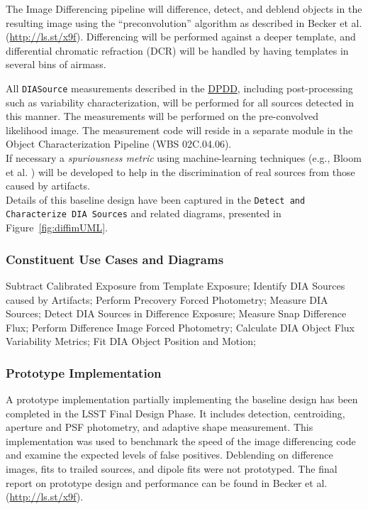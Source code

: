 \documentclass[12pt]{article}
\newcommand{\code}[1]{\texttt{#1}}
\newcommand{\DIASource}{\code{DIASource}\xspace}
\newcommand{\ds}[2]{{\color{blue} \href{https://docushare.lsstcorp.org/docushare/dsweb/Get/#1}{#2}}\xspace}
\newcommand{\DPDD}{\ds{LSE-163}{DPDD}}
\newcommand{\wbsObjChar}{WBS 02C.04.06}
\newcommand{\uc}[1]{{\tt #1}}
\begin{document}
The Image Differencing pipeline will difference, detect, and deblend objects in the resulting image using the ``preconvolution'' algorithm as described in Becker et al. (\url{http://ls.st/x9f}).
Differencing will be performed against a deeper template, and differential chromatic refraction (DCR) will be handled by having templates in several bins of airmass.

All \DIASource measurements described in the \DPDD, including post-processing such as variability characterization, will be performed for all sources detected in this manner. The measurements will be performed on the pre-convolved likelihood image. The measurement code will reside in a separate module in the Object Characterization Pipeline (\wbsObjChar).
\\

If necessary a \emph{spuriousness metric} using machine-learning techniques (e.g., Bloom et al. \cite{Bloom12}) will be developed to help in the discrimination of real sources from those caused by artifacts.
\\

Details of this baseline design have been captured in the \uc{Detect and Characterize DIA Sources} and related diagrams, presented in Figure~\ref{fig:diffimUML}.

\subsubsection{Constituent Use Cases and Diagrams}

Subtract Calibrated Exposure from Template Exposure; Identify DIA Sources caused by Artifacts; Perform Precovery Forced Photometry; Measure DIA Sources; Detect DIA Sources in Difference Exposure; Measure Snap Difference Flux; Perform Difference Image Forced Photometry; Calculate DIA Object Flux Variability Metrics; Fit DIA Object Position and Motion;

\subsubsection{Prototype Implementation}

A prototype implementation partially implementing the baseline design has been completed in the LSST Final Design Phase. It includes detection, centroiding, aperture and PSF photometry, and adaptive shape measurement.
This implementation was used to benchmark the speed of the image differencing code and examine the expected levels of false positives. Deblending on difference images, fits to trailed sources, and dipole fits were not prototyped. The final report on prototype design and performance can be found in Becker et al. (\url{http://ls.st/x9f}).
\\
\end{document}
